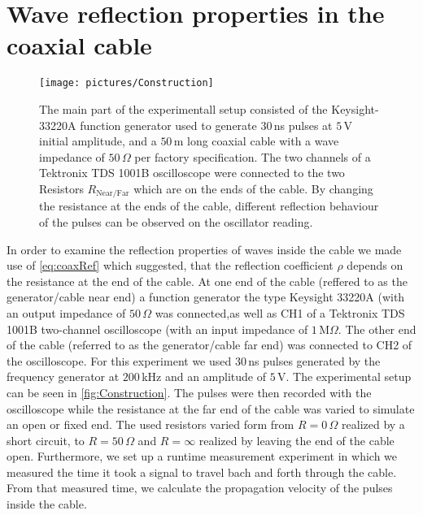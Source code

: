 \documentclass[a4paper,10pt,twocolumn]{article}
\begin{document}
    \section{Wave reflection properties in the coaxial cable}
    \label{sec:reflectionProperties}
    \begin{figure}[htbp]                                 %
        \begin{center}                                       %
            \texttt{[image: pictures/Construction]}      %
            \caption[]{The main part of the experimentall setup consisted of the Keysight-33220A function generator used to generate $30\,$ns pulses at $5\,$V initial amplitude, and a $50\,$m long
            coaxial cable with a wave impedance of $50\,\Omega$ per factory specification.
            The two channels of a Tektronix TDS 1001B oscilloscope were connected to the two Resistors $R_{\text{Near/Far}}$ which are on the ends of the cable.
            By changing the resistance at the ends of the cable, different reflection behaviour of the pulses can be observed on the oscillator reading.
            }   %
            \label{fig:Construction}                                      %
        \end{center}
    \end{figure}
    In order to examine the reflection properties of waves inside the cable we made use of \autoref{eq:coaxRef} which suggested, that the reflection
    coefficient $\rho$ depends on the resistance at the end of the cable.
    At one end of the cable (reffered to as the generator/cable near end) a function generator the type Keysight 33220A (with an output impedance of $50\,\Omega$
    was connected,as well as CH1 of a Tektronix TDS 1001B two-channel oscilloscope
    (with an input impedance of $1\,\text{M}\Omega$.
    The other end of the cable (referred to as the generator/cable far end) was connected to CH2 of the oscilloscope.
    For this experiment we used $30\,$ns pulses generated by the frequency generator at $200\,$kHz and an amplitude of $5\,$V.
    The experimental setup can be seen in \autoref{fig:Construction}.
    The pulses were then recorded with the oscilloscope while the resistance at the far end of the cable was varied to simulate an open or fixed end.
    The used resistors varied form from $R=0\,\Omega $ realized by a short circuit, to $R=50\,\Omega$ and $R=\infty$ realized by leaving the end of the cable open.
    Furthermore, we set up a runtime measurement experiment in which we measured the time it took a signal to travel bach and forth through the cable.
    From that measured time, we calculate the propagation velocity of the pulses inside the cable.
    
\end{document}
